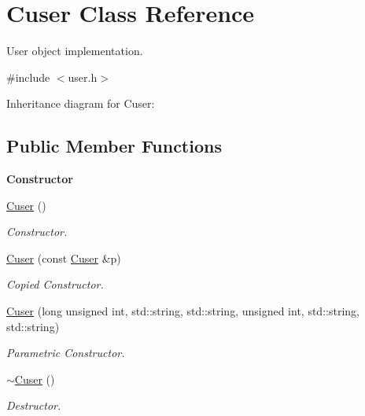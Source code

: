 \hypertarget{class_cuser}{}\section{Cuser Class Reference}
\label{class_cuser}


User object implementation.  




{\ttfamily \#include $<$user.\+h$>$}



Inheritance diagram for Cuser\+:
\subsection*{Public Member Functions}
\begin{Indent}{\bf Constructor}\par
\begin{DoxyCompactItemize}
\item 
\hyperlink{class_cuser_a28d26161b1076a72f30e41d52132e636}{Cuser} ()
\begin{DoxyCompactList}\small\item\em Constructor. \end{DoxyCompactList}\item 
\hyperlink{class_cuser_a6c2305c658e82cd50ec20778069b1539}{Cuser} (const \hyperlink{class_cuser}{Cuser} \&p)
\begin{DoxyCompactList}\small\item\em Copied Constructor. \end{DoxyCompactList}\item 
\hyperlink{class_cuser_af6aa55b35e256a681069a15b9a2931a2}{Cuser} (long unsigned int, std\+::string, std\+::string, unsigned int, std\+::string, std\+::string)
\begin{DoxyCompactList}\small\item\em Parametric Constructor. \end{DoxyCompactList}\item 
\hyperlink{class_cuser_a42e6967197e231f8a62d5d2c86451ca4}{$\sim$\+Cuser} ()\hypertarget{class_cuser_a42e6967197e231f8a62d5d2c86451ca4}{}\label{class_cuser_a42e6967197e231f8a62d5d2c86451ca4}

\begin{DoxyCompactList}\small\item\em Destructor. \end{DoxyCompactList}\end{DoxyCompactItemize}
\end{Indent}

